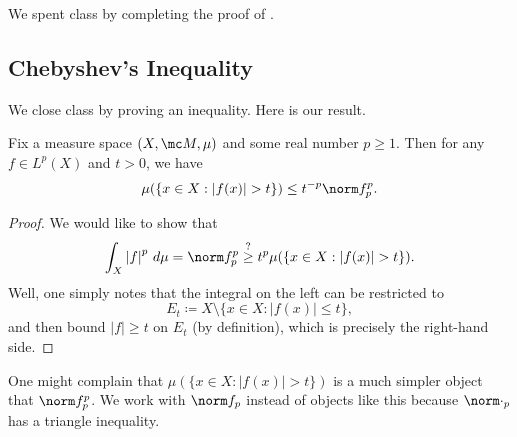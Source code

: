 \documentclass[../notes.tex]{subfiles}
\begin{document}
We spent class by completing the proof of .

\subsection{Chebyshev's Inequality}
We close class by proving an inequality. Here is our result.
\begin{proposition} \label{prop:cheby-ineq}
	Fix a measure space $(X,\mc M,\mu)$ and some real number $p\ge1$. Then for any $f\in L^p(X)$ and $t>0$, we have
	\[\mu(\{x\in X:\left|f(x)\right|>t\})\le t^{-p}\norm f_p^p.\]
\end{proposition}
\begin{proof}
	We would like to show that
	\[\int_X\left|f\right|^p\,d\mu=\norm f_p^p\stackrel?\ge t^p\mu(\{x\in X:\left|f(x)\right|>t\}).\]
	Well, one simply notes that the integral on the left can be restricted to
	\[E_t\coloneqq X\setminus\{x\in X:\left|f(x)\right|\le t\},\]
	and then bound $\left|f\right|\ge t$ on $E_t$ (by definition), which is precisely the right-hand side.
\end{proof}
\begin{remark}
	One might complain that $\mu(\{x\in X:\left|f(x)\right|>t\})$ is a much simpler object that $\norm f_p^p$. We work with $\norm f_p$ instead of objects like this because $\norm\cdot_p$ has a triangle inequality.
\end{remark}
\end{document}
